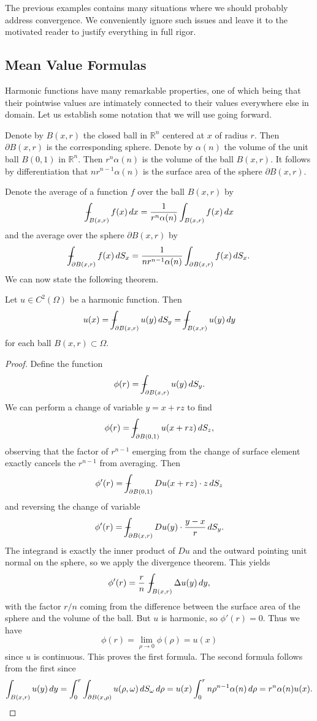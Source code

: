 \begin{remark}
The previous examples contains many situations where we should probably address convergence. We conveniently ignore such issues and leave it to the motivated reader to justify everything in full rigor.
\end{remark}

\subsection{Mean Value Formulas}

Harmonic functions have many remarkable properties, one of which being that their pointwise values are intimately connected to their values everywhere else in domain. Let us establish some notation that we will use going forward.

Denote by $B(x,r)$ the closed ball in $\mathbb{R}^n$ centered at $x$ of radius $r$. Then $\partial B(x,r)$ is the corresponding sphere. Denote by $\alpha(n)$ the volume of the unit ball $B(0,1)$ in $\mathbb{R}^n$. Then $r^n\alpha(n)$ is the volume of the ball $B(x,r)$. It follows by differentiation that $n r^{n-1} \alpha(n)$ is the surface area of the sphere $\partial B(x,r)$.

Denote the average of a function $f$ over the ball $B(x,r)$ by
\[\dashint_{B(x,r)} f(x)\,dx = \frac{1}{r^n \alpha(n)} \int_{B(x,r)} f(x)\,dx\]
and the average over the sphere $\partial B(x,r)$ by
\[\dashint_{\partial B(x,r)} f(x)\,dS_x = \frac{1}{n r^{n-1} \alpha(n)} \int_{\partial B(x,r)} f(x)\,dS_x.\]
We can now state the following theorem.

\begin{theorem}
Let $u \in C^2(\Omega)$ be a harmonic function. Then
\[u(x) = \dashint_{\partial B(x,r)} u(y)\,dS_y = \dashint_{B(x,r)} u(y)\,dy\]
for each ball $B(x,r) \subset \Omega$.
\begin{proof}
Define the function
\[\phi(r) = \dashint_{\partial B(x,r)} u(y)\,dS_y.\]
We can perform a change of variable $y = x+rz$ to find
\[\phi(r) = \dashint_{\partial B(0,1)} u(x+rz)\,dS_z,\]
observing that the factor of $r^{n-1}$ emerging from the change of surface element exactly cancels the $r^{n-1}$ from averaging. Then
\[\phi'(r) = \dashint_{\partial B(0,1)} Du(x+rz)\cdot z\,dS_z\]
and reversing the change of variable
\[\phi'(r) = \dashint_{\partial B(x,r)} Du(y)\cdot \frac{y-x}{r}\,dS_y.\]
The integrand is exactly the inner product of $Du$ and the outward pointing unit normal on the sphere, so we apply the divergence theorem. This yields
\[\phi'(r) = \frac{r}{n}\ \dashint_{B(x,r)} \Delta u(y)\,dy,\]
with the factor $r/n$ coming from the difference between the surface area of the sphere and the volume of the ball. But $u$ is harmonic, so $\phi'(r) = 0$. Thus we have
\[\phi(r) = \lim_{\rho \rightarrow 0} \phi(\rho) = u(x)\]
since $u$ is continuous. This proves the first formula. The second formula follows from the first since
\[\int_{B(x,r)}u(y)\,dy = \int_0^r \int_{\partial B(x,\rho)} u(\rho,\omega)\,dS_\omega\,d\rho = u(x) \int_0^r n\rho^{n-1}\alpha(n)\,d\rho = r^n\alpha(n)u(x). \qedhere\]
\end{proof}
\end{theorem}

